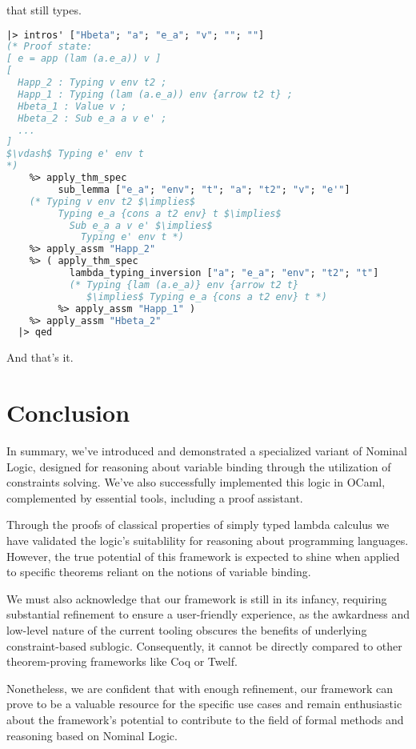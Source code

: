 \documentclass[english, mgr]{iithesis}
\newcommand{\lstt}[1]{{\text{\lstinline[columns=fixed,mathescape]{#1}}}}
\begin{document}
that \lstt{e'} still types.
\begin{lstlisting}[mathescape,language=OCaml,escapebegin=\color{codegreen}]
  |> intros' ["Hbeta"; "a"; "e_a"; "v"; ""; ""]
(* Proof state:
[ e = app (lam (a.e_a)) v ]
[
  Happ_2 : Typing v env t2 ;
  Happ_1 : Typing (lam (a.e_a)) env {arrow t2 t} ;
  Hbeta_1 : Value v ;
  Hbeta_2 : Sub e_a a v e' ;
  ...
]
$\vdash$ Typing e' env t
*)
    %> apply_thm_spec
         sub_lemma ["e_a"; "env"; "t"; "a"; "t2"; "v"; "e'"]
    (* Typing v env t2 $\implies$
         Typing e_a {cons a t2 env} t $\implies$
           Sub e_a a v e' $\implies$
             Typing e' env t *)
    %> apply_assm "Happ_2"
    %> ( apply_thm_spec
           lambda_typing_inversion ["a"; "e_a"; "env"; "t2"; "t"]
           (* Typing {lam (a.e_a)} env {arrow t2 t}
              $\implies$ Typing e_a {cons a t2 env} t *)
         %> apply_assm "Happ_1" )
    %> apply_assm "Hbeta_2"
  |> qed
\end{lstlisting}
And that's it.
\chapter{Conclusion}

In summary, we've introduced and demonstrated a specialized variant of Nominal Logic,
designed for reasoning about variable binding
through the utilization of constraints solving.
We've also successfully implemented this logic in OCaml,
complemented by essential tools, including a proof assistant.

Through the proofs of classical properties of simply typed lambda calculus
we have validated the logic's suitablility for reasoning about programming languages.
However, the true potential of this framework is expected to shine when applied to
specific theorems reliant on the notions of variable binding.

We must also acknowledge that our framework is still in its infancy,
requiring substantial refinement to ensure a user-friendly experience, as the
awkardness and low-level nature of the current tooling obscures the benefits
of underlying constraint-based sublogic.
Consequently, it cannot be directly compared to other theorem-proving frameworks
like Coq or Twelf.

Nonetheless, we are confident that with enough refinement,
our framework can prove to be a valuable resource for the specific use cases and
remain enthusiastic about the framework's potential to
contribute to the field of formal methods and reasoning based on Nominal Logic.
\end{document}
